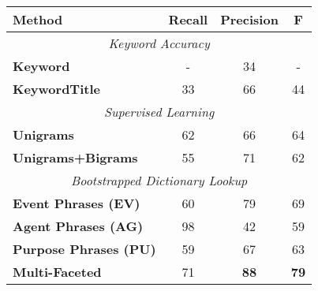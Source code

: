 \begin{table}[ht]
\small
\centering
\begin{tabular}[center]{|lccc|} \hline
{\bf Method} & {\bf Recall} & {\bf Precision} & {\bf F}\\ \hline 

\multicolumn{4}{|c|}{\it Keyword Accuracy} \\ \hline
{\bf Keyword} & - & 34 & -\\
{\bf KeywordTitle} & 33 & 66 & 44\\ \hline
\multicolumn{4}{|c|}{\it Supervised Learning} \\ \hline
{\bf Unigrams} & 62 & 66 & 64 \\
{\bf Unigrams+Bigrams} & 55 & 71 & 62 \\ \hline
\multicolumn{4}{|c|}{\it Bootstrapped Dictionary Lookup} \\ \hline
{\bf Event Phrases (EV)} & 60 & 79 & 69\\
{\bf Agent Phrases (AG)} & 98 & 42 & 59\\
{\bf Purpose Phrases (PU)} & 59 & 67 & 63\\ 
{\bf Multi-Faceted} & 71 & {\bf 88} & {\bf 79}\\ \hline


\end{tabular}
\end{table}
